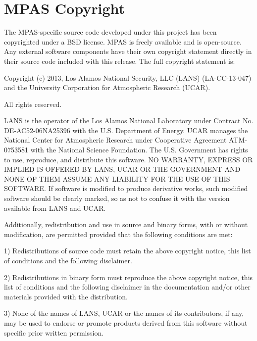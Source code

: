 
\chapter{MPAS Copyright}

{\parindent=0pt  \parskip=5pt

The MPAS-specific source code developed under this project has been copyrighted under a BSD license.  MPAS is freely available and is open-source.  Any external software components have their own copyright statement directly in their source code included with this release.  The full copyright statement is:

Copyright (c) 2013,  Los Alamos National Security, LLC (LANS) (LA-CC-13-047)
and the University Corporation for Atmospheric Research (UCAR).   

All rights reserved. 

LANS is the operator of the Los Alamos National Laboratory under Contract No.
DE-AC52-06NA25396 with the U.S. Department of Energy.  UCAR manages the National
Center for Atmospheric Research under Cooperative Agreement ATM-0753581 with the
National Science Foundation.  The U.S. Government has rights to use, reproduce,
and distribute this software.  NO WARRANTY, EXPRESS OR IMPLIED IS OFFERED BY
LANS, UCAR OR THE GOVERNMENT AND NONE OF THEM ASSUME ANY LIABILITY FOR THE USE
OF THIS SOFTWARE.  If software is modified to produce derivative works, such
modified software should be clearly marked, so as not to confuse it with the
version available from LANS and UCAR.

Additionally, redistribution and use in source and binary forms, with or without
modification, are permitted provided that the following conditions are met:

1) Redistributions of source code must retain the above copyright notice, this
list of conditions and the following disclaimer.

2) Redistributions in binary form must reproduce the above copyright notice,
this list of conditions and the following disclaimer in the documentation and/or
other materials provided with the distribution.

3) None of the names of LANS, UCAR or the names of its contributors, if any, may
be used to endorse or promote products derived from this software without
specific prior written permission.

}
